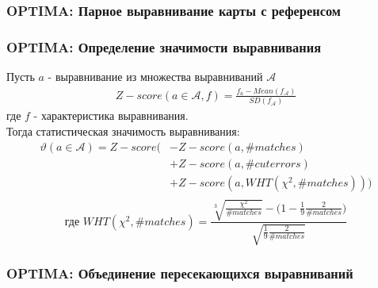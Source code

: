\begin{frame}
\frametitle{OPTIMA: Парное выравнивание карты с референсом}

\end{frame}

\begin{frame}
\frametitle{OPTIMA: Определение значимости выравнивания}
Пусть $a$ - выравнивание из множества выравниваний $\mathcal{A}$
\begin{gather*}
Z-score(a \in \mathcal{A}, f) = \frac{f_{a} - Mean(f_{\mathcal{A}})}{SD(f_{\mathcal{A}})}
\end{gather*}
где $f$ - характеристика выравнивания.\\
 Тогда статистическая значимость выравнивания:
\begin{align*}
  \vartheta (a \in \mathcal{A}) = Z-score( & -Z-score(a, \#matches) \\
  & + Z-score(a, \#cuterrors) \\
  & + Z-score(a, WHT(\chi^2, \#matches))) \\
\end{align*}
\[\text{где } WHT(\chi^2, \#matches) = \frac{\sqrt[3]{\frac{\chi^2}{\#matches}} - \big(1 - \frac{1}{9} \frac{2}{\#matches}\big)}{\sqrt{\frac{1}{9} \frac{2}{\#matches}}}\]
\end{frame}

\begin{frame}
\frametitle{OPTIMA: Объединение пересекающихся выравниваний}

\end{frame}
